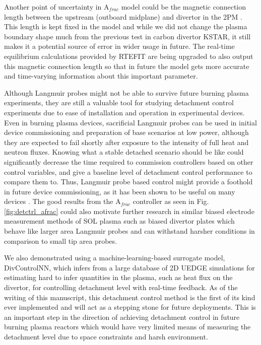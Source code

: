 \documentclass[10pt]{iopart}
\newcommand{\Afrac}{A$_{frac}$}
\begin{document}
Another point of uncertainty in \Afrac{} model could be the magnetic connection length between the upstream (outboard midplane) and divertor in the 2PM \cite{Leonard_2018_PPCF}.
This length is kept fixed in the model and while we did not change the plasma boundary shape much from the previous test \cite{Eldon_2022_PPCF} in carbon divertor KSTAR, it still makes it a potential source of error in wider usage in future.
The real-time equilibrium calculations provided by RTEFIT are being upgraded to also output this magnetic connection length so that in future the model gets more accurate and time-varying information about this important parameter.

Although Langmuir probes might not be able to survive future burning plasma experiments, they are still a valuable tool for studying detachment control experiments due to ease of installation and operation in experimental devices.
Even in burning plasma devices, sacrificial Langmuir probes can be used in initial device commissioning and preparation of base scenarios at low power, although they are expected to fail shortly after exposure to the intensity of full heat and neutron fluxes.
Knowing what a stable detached scenario should be like could significantly decrease the time required to commission controllers based on other control variables, and give a baseline level of detachment control performance to compare them to.
Thus, Langmuir probe based control might provide a foothold in future device commissioning, as it has been shown to be useful on many devices \cite{Eldon_2021_NME, Guillemaut_2017_PPCF, Yuan_2020_FED, Khodunov_2021_PPCF}.
The good results from the \Afrac{} controller as seen in Fig.\ref{fig:detctrl_afrac} could also motivate further research in similar biased electrode measurement methods of SOL plasma such as biased divertor plates \cite{Toi_2023_NF, Cui_2024_NF} which behave like larger area Langmuir probes and can withstand harsher conditions in comparison to small tip area probes.

We also demonstrated using a machine-learning-based surrogate model, DivControlNN, which infers from a large database of 2D UEDGE simulations for estimating hard to infer quantities in the plasma, such as heat flux on the divertor, for controlling detachment level with real-time feedback.
As of the writing of this manuscript, this detachment control method is the first of its kind ever implemented and will act as a stepping stone for future deployments.
This is an important step in the direction of achieving detachment control in future burning plasma reactors which would have very limited means of measuring the detachment level due to space constraints and harsh environment.
\end{document}
